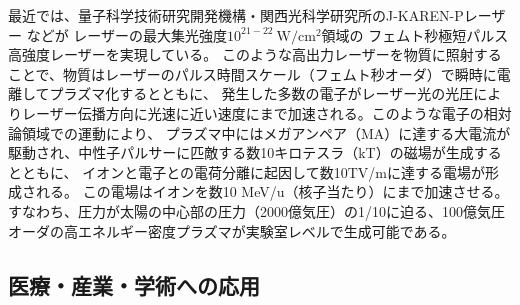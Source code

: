 \documentclass[a4paper,11pt,titlepage]{jarticle}
\numberwithin{equation}{section} %
\begin{document}
最近では、量子科学技術研究開発機構・関西光科学研究所のJ-KAREN-Pレーザー
\cite{t19,t20}などが
レーザーの最大集光強度$10^{21-22}\ \mathrm{W/cm^{2}}$領域の
フェムト秒極短パルス高強度レーザーを実現している。
このような高出力レーザーを物質に照射することで、物質はレーザーのパルス時間スケール（フェムト秒オーダ）で瞬時に電離してプラズマ化するとともに、
発生した多数の電子がレーザー光の光圧によりレーザー伝播方向に光速に近い速度にまで加速される。このような電子の相対論領域での運動により、
プラズマ中にはメガアンペア（MA）に達する大電流が駆動され、中性子パルサーに匹敵する数10キロテスラ（kT）の磁場が生成するとともに、
イオンと電子との電荷分離に起因して数10TV/mに達する電場が形成される。
この電場はイオンを数10 MeV/u（核子当たり）にまで加速させる。
すなわち、圧力が太陽の中心部の圧力（2000億気圧）の1/10に迫る、100億気圧オーダの高エネルギー密度プラズマが実験室レベルで生成可能である。


\begin{table}[H]
  \caption{レーザーの一覧}
  \centering
\end{table}

\subsection{医療・産業・学術への応用}
\end{document}
